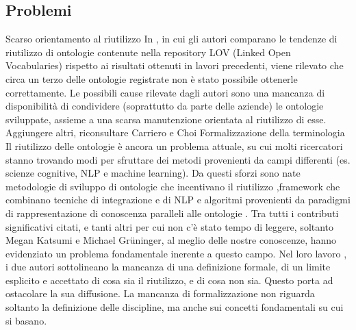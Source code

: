 \subsection{Problemi}
Scarso orientamento al riutilizzo In \cite{...}, in cui gli autori comparano le tendenze di riutilizzo di ontologie contenute nella repository LOV (Linked Open Vocabularies) rispetto ai risultati ottenuti in lavori precedenti, viene rilevato che circa un terzo delle ontologie registrate non è stato possibile ottenerle correttamente. Le possibili cause rilevate dagli autori sono una mancanza di disponibilità di condividere (soprattutto da parte delle aziende) le ontologie sviluppate, assieme a una scarsa manutenzione orientata al riutilizzo di esse.
Aggiungere altri, riconsultare Carriero e Choi
Formalizzazione della terminologia
Il riutilizzo delle ontologie è ancora un problema attuale, su cui molti ricercatori stanno trovando modi per sfruttare dei metodi provenienti da campi differenti (es. scienze cognitive, NLP e machine learning). Da questi sforzi sono nate metodologie di sviluppo di ontologie che incentivano il riutilizzo \cite{...},framework che combinano tecniche di integrazione e di NLP \cite{...} e algoritmi provenienti da paradigmi di rappresentazione di conoscenza paralleli alle ontologie \cite{...}. Tra tutti i contributi significativi citati, e tanti altri per cui non c'è stato tempo di leggere, soltanto Megan Katsumi e Michael Grüninger, al meglio delle nostre conoscenze, hanno evidenziato un problema fondamentale inerente a questo campo. Nel loro lavoro \cite{...}, i due autori sottolineano la mancanza di una definizione formale, di un limite esplicito e accettato di cosa sia il riutilizzo, e di cosa non sia. Questo porta ad ostacolare la sua diffusione. La mancanza di formalizzazione non riguarda soltanto la definizione delle discipline, ma anche sui concetti fondamentali su cui si basano.

\evv

